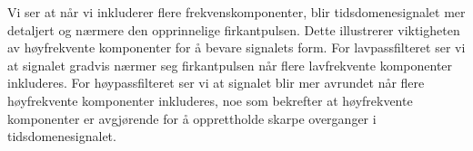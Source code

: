 \clearpage
\noindent Vi ser at når vi inkluderer flere frekvenskomponenter, blir tidsdomenesignalet mer detaljert og nærmere den opprinnelige firkantpulsen. Dette illustrerer viktigheten av høyfrekvente komponenter for å bevare signalets form. For lavpassfilteret ser vi at signalet gradvis nærmer seg firkantpulsen når flere lavfrekvente komponenter inkluderes. For høypassfilteret ser vi at signalet blir mer avrundet når flere høyfrekvente komponenter inkluderes, noe som bekrefter at høyfrekvente komponenter er avgjørende for å opprettholde skarpe overganger i tidsdomenesignalet.
\clearpage

